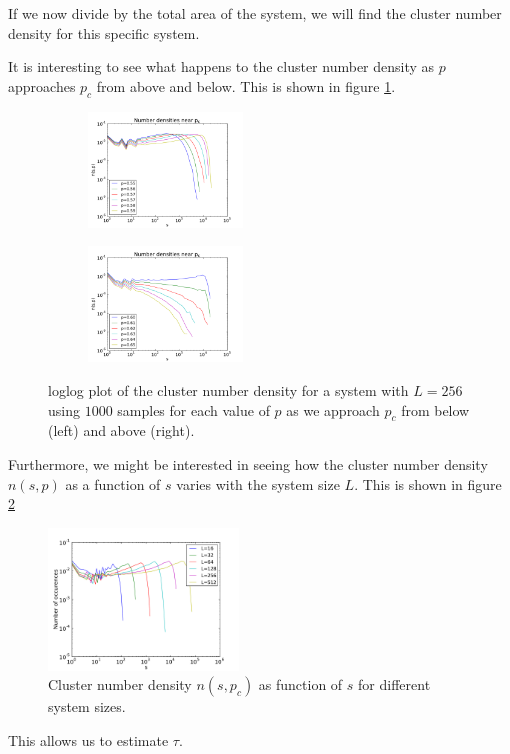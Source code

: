 \documentclass[a4paper,reprint,floatfix,amsmath,amssymb,aps,pra]{revtex4-1}
\begin{document}
If we now divide by the total area of the system, we will find the cluster number density for this specific system.

It is interesting to see what happens to the cluster number density as $p$ approaches $p_c$ from above and below. This is shown in figure \ref{fig:cluster-number-density}.

\begin{figure}
  \centering
  \begin{subfigure}
  \centering
  \includegraphics[width=0.45\textwidth]{../percolation/results/1e/n-vs-s-L256-nsamples10000-frombelow.pdf}
  \end{subfigure}
  \begin{subfigure}
  \centering
  \includegraphics[width=0.45\textwidth]{../percolation/results/1e/n-vs-s-L256-nsamples10000-fromabove.pdf}
  \end{subfigure}
  \caption{loglog plot of the cluster number density for a system with $L=256$ using $1000$ samples for each value of $p$ as we approach $p_c$ from below (left) and above (right).}
  \label{fig:cluster-number-density}
\end{figure}

Furthermore, we might be interested in seeing how the cluster number density $n(s,p)$ as a function of $s$ varies with the system size $L$. This is shown in figure \ref{fig:cluster-number-density-systemsize}
\begin{figure}
  \centering
  \includegraphics[width=0.45\textwidth]{../percolation/results/1f/n-vs-s-nsamples10000.pdf}
  \caption{Cluster number density $n(s,p_c)$ as function of $s$ for different system sizes.}
  \label{fig:cluster-number-density-systemsize}
\end{figure}

This allows us to estimate $\tau$. %
\end{document}
